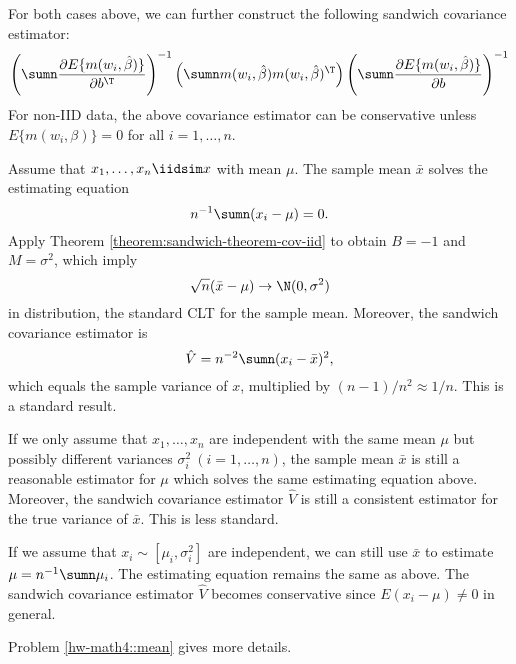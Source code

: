 For both cases above, we can further construct the following sandwich covariance estimator:
$$
\left( \sumn  
 \frac{\partial E \{ m(w_i, \hat\beta) \} }{\partial b^{\T}}  \right)^{-1} 
 \left( \sumn  m(w_{i},  \hat\beta) m(w_{i},  \hat\beta)^{\T}  \right)
  \left( \sumn  
 \frac{\partial E\{ m(w_i,  \hat\beta) \} }{\partial b}  \right)^{-1} 
$$
For non-IID data, the above covariance estimator can be conservative unless $ E\{ m(w_i, \beta) \}  = 0$ for all $i=1, \ldots, n$. 



\begin{example}
\label{eg::sample-variance}
Assume that $x_1,\ldots, x_n \iidsim x$ with mean $\mu$. The sample mean $\bar{x}$ solves the estimating equation
$$
n^{-1} \sumn (x_i -  \mu) = 0.
$$
Apply Theorem \ref{theorem:sandwich-theorem-cov-iid} to obtain $B = -1$ and $M = \sigma^2$, which imply
$$
\sqrt{n} (\bar{x}  -\mu   ) \rightarrow  \N( 0, \sigma^2)
$$
in distribution, the standard CLT for the sample mean. Moreover, the sandwich covariance estimator is
$$
\hat{V}  = 
n^{-2} \sumn ( x_i -  \bar{x}  )^2 ,
$$
which equals the sample variance of $x$, multiplied by $(n-1)/n^2 \approx 1/n$. This is a standard result. 

If we only assume that $x_1,\ldots, x_n$ are independent with the same mean $\mu$ but possibly different variances $\sigma_i^2\ (i=1,\ldots, n)$, the sample mean $\bar{x}$ is still a reasonable estimator for $\mu$ which solves the same estimating equation above. Moreover, the sandwich covariance estimator $\hat{V} $ is still a consistent estimator for the true variance of $\bar{x}$. This is less standard. 


If we assume that $x_i \sim [\mu_i, \sigma_i^2]$ are independent, we can still use $\bar{x}$ to estimate $\mu = n^{-1} \sumn \mu_i $. The estimating equation remains the same as above. The sandwich covariance estimator $\hat{V}$ becomes conservative since $E(x_i - \mu) \neq 0$ in general. 

Problem \ref{hw-math4::mean} gives more details.
\end{example}



